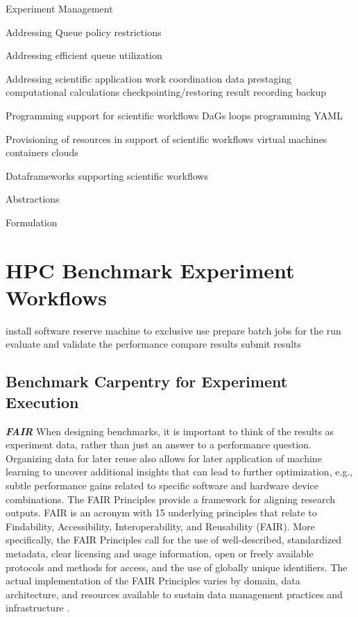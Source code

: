 \documentclass[utf8]{FrontiersinVancouver} %
\begin{document}
Experiment Management

Addressing  Queue policy restrictions

Addressing efficient queue utilization

Addressing scientific application work coordination
    data prestaging
    computational calculations
    checkpointing/restoring
    result recording
    backup

Programming support for scientific workflows
    DaGs
    loops
    programming
    YAML
    
Provisioning of resources in support of scientific workflows
    virtual machines
    containers
    clouds

Dataframeworks supporting scientific workflows

Abstractions

Formulation








\section{HPC Benchmark  Experiment Workflows}

install software
reserve machine to exclusive use
prepare batch jobs for the run
evaluate and validate the performance
compare results
submit results




\subsection{Benchmark Carpentry for Experiment Execution}

\textbf{\textit{FAIR}}
When designing benchmarks, it is important to think of the results as experiment data, rather than just an answer to a performance question. Organizing data for later reuse also allows for later application of machine learning to uncover additional insights that can lead to further optimization, e.g., subtle performance gains related to specific software and hardware device combinations. The FAIR Principles provide a framework for aligning research outputs. FAIR is an acronym with 15 underlying principles that relate to Findability, Accessibility, Interoperability, and Reusability (FAIR)\citep{wilkinson2016fair}. More specifically, the FAIR Principles call for the use of well-described, standardized metadata, clear licensing and usage information, open or freely available protocols and methods for access, and the use of globally unique identifiers. The actual implementation of the FAIR Principles varies by domain, data architecture, and resources available to sustain data management practices and infrastructure \citep{jacobsen2020fair}.
\end{document}
